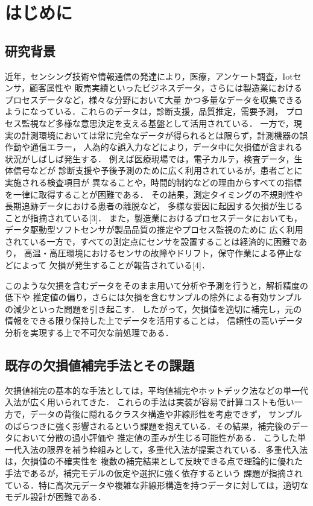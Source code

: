 \section{はじめに}
\subsection{研究背景}
近年，センシング技術や情報通信の発達により，医療，アンケート調査，Iotセンサ，顧客属性や
販売実績といったビジネスデータ，さらには製造業におけるプロセスデータなど，様々な分野において大量
かつ多量なデータを収集できるようになっている．これらのデータは，診断支援，品質推定，需要予測，
プロセス監視など多様な意思決定を支える基盤として活用されている．
一方で，現実の計測環境においては常に完全なデータが得られるとは限らず，計測機器の誤作動や通信エラー，
人為的な誤入力などにより，データ中に欠損値が含まれる状況がしばしば発生する．
例えば医療現場では，電子カルテ，検査データ，生体信号などが
診断支援や予後予測のために広く利用されているが，患者ごとに実施される検査項目が
異なることや，時間的制約などの理由からすべての指標を一律に取得することが困難である．
その結果，測定タイミングの不規則性や長期追跡データにおける患者の離脱など，
多様な要因に起因する欠損が生じることが指摘されている[3]．
また，製造業におけるプロセスデータにおいても，データ駆動型ソフトセンサが製品品質の推定やプロセス監視のために
広く利用されている一方で，すべての測定点にセンサを設置することは経済的に困難であり，
高温・高圧環境におけるセンサの故障やドリフト，保守作業による停止などによって
欠損が発生することが報告されている[4]．

このような欠損を含むデータをそのまま用いて分析や予測を行うと，解析精度の低下や
推定値の偏り，さらには欠損を含むサンプルの除外による有効サンプルの減少といった問題を引き起こす．
したがって，欠損値を適切に補完し，元の情報をできる限り保持した上でデータを活用することは，
信頼性の高いデータ分析を実現する上で不可欠な前処理である．

\subsection{既存の欠損値補完手法とその課題}
欠損値補完の基本的な手法としては，平均値補完やホットデック法などの単一代入法が広く用いられてきた．
これらの手法は実装が容易で計算コストも低い一方で，データの背後に隠れるクラスタ構造や非線形性を考慮できず，
サンプルのばらつきに強く影響されるという課題を抱えている．その結果，補完後のデータにおいて分散の過小評価や
推定値の歪みが生じる可能性がある．
こうした単一代入法の限界を補う枠組みとして，多重代入法が提案されている．多重代入法は，欠損値の不確実性を
複数の補完結果として反映できる点で理論的に優れた手法であるが，補完モデルの仮定や選択に強く依存するという
課題が指摘されている．特に高次元データや複雑な非線形構造を持つデータに対しては，適切なモデル設計が困難である．

